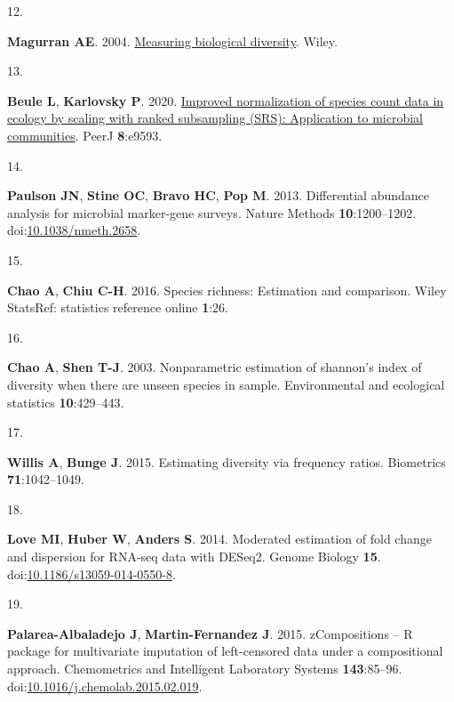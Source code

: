 \documentclass[
]{article}
\newlength{\cslhangindent}
\newlength{\csllabelwidth}
\newlength{\cslentryspacingunit} %
\newenvironment{CSLReferences}[2] %
 {%
  \setlength{\parindent}{0pt}
  \ifodd #1
  \let\oldpar\par
  \def\par{\hangindent=\cslhangindent\oldpar}
  \fi
  \setlength{\parskip}{#2\cslentryspacingunit}
 }%
 {}
\newcommand{\CSLLeftMargin}[1]{\parbox[t]{\csllabelwidth}{#1}}
\newcommand{\CSLRightInline}[1]{\parbox[t]{\linewidth - \csllabelwidth}{#1}\break}
\begin{document}
\begin{CSLReferences}{0}{1}
\leavevmode{}%
\CSLLeftMargin{12. }%
\CSLRightInline{\textbf{Magurran AE}. 2004.
\href{https://books.google.com/books?id=tUqzLSUzXxcC}{Measuring
biological diversity}. Wiley.}

\leavevmode{}%
\CSLLeftMargin{13. }%
\CSLRightInline{\textbf{Beule L}, \textbf{Karlovsky P}. 2020.
\href{https://doi.org/10.7717/peerj.9593}{Improved normalization of
species count data in ecology by scaling with ranked subsampling (SRS):
Application to microbial communities}. PeerJ \textbf{8}:e9593.}

\leavevmode{}%
\CSLLeftMargin{14. }%
\CSLRightInline{\textbf{Paulson JN}, \textbf{Stine OC}, \textbf{Bravo
HC}, \textbf{Pop M}. 2013. Differential abundance analysis for microbial
marker-gene surveys. Nature Methods \textbf{10}:1200--1202.
doi:\href{https://doi.org/10.1038/nmeth.2658}{10.1038/nmeth.2658}.}

\leavevmode{}%
\CSLLeftMargin{15. }%
\CSLRightInline{\textbf{Chao A}, \textbf{Chiu C-H}. 2016. Species
richness: Estimation and comparison. Wiley StatsRef: statistics
reference online \textbf{1}:26.}

\leavevmode{}%
\CSLLeftMargin{16. }%
\CSLRightInline{\textbf{Chao A}, \textbf{Shen T-J}. 2003. Nonparametric
estimation of shannon's index of diversity when there are unseen species
in sample. Environmental and ecological statistics
\textbf{10}:429--443.}

\leavevmode{}%
\CSLLeftMargin{17. }%
\CSLRightInline{\textbf{Willis A}, \textbf{Bunge J}. 2015. Estimating
diversity via frequency ratios. Biometrics \textbf{71}:1042--1049.}

\leavevmode{}%
\CSLLeftMargin{18. }%
\CSLRightInline{\textbf{Love MI}, \textbf{Huber W}, \textbf{Anders S}.
2014. Moderated estimation of fold change and dispersion for {RNA}-seq
data with {DESeq}2. Genome Biology \textbf{15}.
doi:\href{https://doi.org/10.1186/s13059-014-0550-8}{10.1186/s13059-014-0550-8}.}

\leavevmode{}%
\CSLLeftMargin{19. }%
\CSLRightInline{\textbf{Palarea-Albaladejo J}, \textbf{Martin-Fernandez
J}. 2015. zCompositions -- {R} package for multivariate imputation of
left-censored data under a compositional approach. Chemometrics and
Intelligent Laboratory Systems \textbf{143}:85--96.
doi:\href{https://doi.org/10.1016/j.chemolab.2015.02.019}{10.1016/j.chemolab.2015.02.019}.}


\end{CSLReferences}
\end{document}

